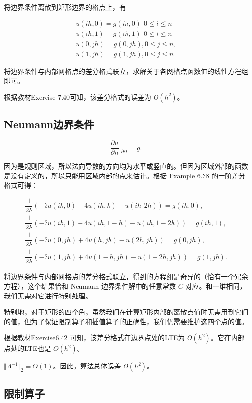 \documentclass{ctexart}
\begin{document}
将边界条件离散到矩形边界的格点上，有

\begin{align}
	u(ih,0) = g(ih,0),0\leq i\leq n,\\
	u(ih,1) = g(ih,1),0\leq i\leq n,\\
	u(0,jh) = g(0,jh),0\leq j\leq n,\\
	u(1,jh) = g(1,jh),0\leq j\leq n.
\end{align}

将边界条件与内部网格点的差分格式联立，求解关于各网格点函数值的线性方程组即可。

根据教材Exercise 7.40可知，该差分格式的误差为 $O(h^2)$。

\subsection{Neumann边界条件}

\begin{equation}
    \dfrac{\partial u}{\partial n}|_{\partial \Omega} = g.
\end{equation}

因为是规则区域，所以法向导数的方向均为水平或竖直的。但因为区域外部的函数是没有定义的，所以只能用区域内部的点来估计。根据 Example 6.38 的一阶差分格式可得：

\begin{align}
    \dfrac 1{2h}(-3u(ih,0)+4u(ih,h)-u(ih,2h)) = g(ih,0),\\
    \dfrac 1{2h}(-3u(ih,1)+4u(ih,1-h)-u(ih,1-2h)) = g(ih,1),\\
    \dfrac 1{2h}(-3u(0,jh)+4u(h,jh)-u(2h,jh)) = g(0,jh),\\
    \dfrac 1{2h}(-3u(1,jh)+4u(1-h,jh)-u(1-2h,jh)) = g(1,jh).
\end{align}

将边界条件与内部网格点的差分格式联立，得到的方程组是奇异的（恰有一个冗余方程），这个结果恰和 Neumann 边界条件解中的任意常数 $C$ 对应。和一维相同，我们无需对它进行特别处理。

特别地，对于矩形的四个角，虽然我们在计算矩形内部的离散点值时无需用到它们的值，但为了保证限制算子和插值算子的正确性，我们仍需要维护这四个点的值。

根据教材Exercise6.42 可知，该差分格式在边界点处的LTE为 $O(h^2)$。它在内部点处的LTE也是 $O(h^2)$。

$\Vert A^{-1}\Vert_2=O(1)$。因此，算法总体误差 $O(h^2)$。

\subsection{限制算子}
\end{document}
